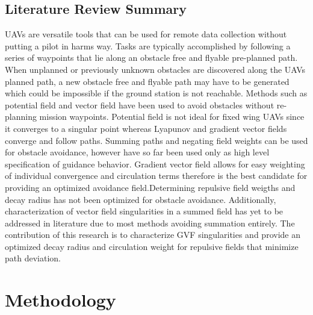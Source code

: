 \documentclass[numbered,pdftex]{ohio-etd}
\begin{document}
\section{Literature Review Summary}
UAVs are versatile tools that can be used for remote data collection without putting a pilot in harms way. Tasks are typically accomplished by following a series of waypoints that lie along an obstacle free and flyable pre-planned path. When unplanned or previously unknown obstacles are discovered along the UAVs planned path, a new obstacle free and flyable path may have to be generated which could be impossible if the ground station is not reachable. Methods such as potential field and vector field have been used to avoid obstacles without re-planning mission waypoints. Potential field is not ideal for fixed wing UAVs since it converges to a singular point whereas Lyapunov and gradient vector fields converge and follow paths. Summing paths and negating field weights can be used for obstacle avoidance, however have so far been used only as high level specification of guidance behavior. Gradient vector field allows for easy weighting of individual convergence and circulation terms therefore is the best candidate for providing an optimized avoidance field.Determining repulsive field weigths and decay radius has not been optimized for obstacle avoidance. Additionally, characterization of vector field singularities in a summed field has yet to be addressed in literature due to most methods avoiding summation entirely. The contribution of this research is to characterize GVF singularities and provide an optimized decay radius and circulation weight for repulsive fields that minimize path deviation. 

\chapter{Methodology}
\end{document}
